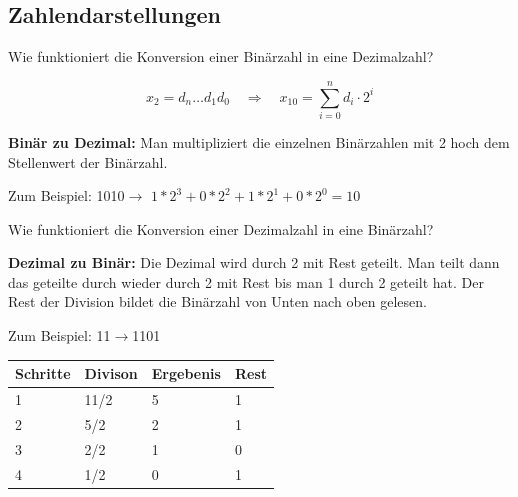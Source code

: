 \documentclass
[
  draft    = true,
  fontsize = 11pt,
  parskip  = half-,
  BCOR     = 0pt,
  DIV      = 11,
  ngerman,
  dvipsnames
]
{scrartcl}
\begin{document}
\subsection*{Zahlendarstellungen}
\begin{mytemize}
  \item Wie funktioniert die Konversion einer Binärzahl in eine Dezimalzahl?
        \begin{achim}
          \begin{equation*}
            x_2=d_n\ldots d_1d_0
            \quad\Rightarrow\quad
            x_{10}=\sum_{i=0}^{n}d_i\cdot2^i
          \end{equation*}
        \end{achim}
        \begin{moritz}
        	\item[] \textbf{Binär zu Dezimal:} Man multipliziert die einzelnen Binärzahlen mit 2 hoch dem Stellenwert der Binärzahl.
          \item[] Zum Beispiel: 1010$\rightarrow$ $1*2^3+0*2^2+1*2^1+0*2^0=10$
        \end{moritz}
  \item Wie funktioniert die Konversion einer Dezimalzahl in eine Binärzahl?
  \begin{moritz}
    \begin{mytemize}
  	\item[] \textbf{Dezimal zu Binär:} Die Dezimal wird durch 2 mit Rest geteilt.
            Man teilt dann das geteilte durch wieder durch 2 mit Rest bis man 1 durch 2 geteilt hat.
            Der Rest der Division bildet die Binärzahl von Unten nach oben gelesen.
    \item[] Zum Beispiel: 11$\rightarrow$1101
      \begin{center}
        \setlength{\tabcolsep}{4ex}
        \begin{tabular}{|l|l|l|l|}
          \hline
          Schritte & Divison & Ergebenis & Rest \\ \hline
          1 & 11/2 & 5 & 1 \\ \hline
          2 & 5/2 & 2 & 1 \\ \hline
          3 & 2/2 & 1 & 0 \\ \hline
          4 & 1/2 & 0 & 1 \\ \hline
        \end{tabular}
      \end{center}
    \end{mytemize}
  \end{moritz}

\end{mytemize}
\end{document}
